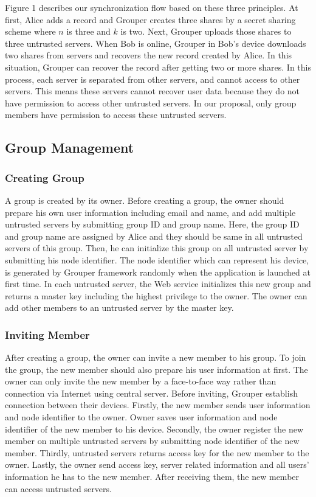 \documentclass[twocolumn,10pt]{article}
\begin{document}
Figure 1 describes our synchronization flow based on these three principles. At first, Alice adds a record and Grouper creates three shares by a secret sharing scheme where $n$ is three and $k$ is two. Next, Grouper uploads those shares to three untrusted servers. When Bob is online, Grouper in Bob's device downloads two shares from servers and recovers the new record created by Alice. In this situation, Grouper can recover the record after getting two or more shares. In this process, each server is separated from other servers, and cannot access to other servers. This means these servers cannot recover user data because they do not have permission to access other untrusted servers. In our proposal, only group members have permission to access these untrusted servers.

\subsection{Group Management}

\subsubsection{Creating Group}

A group is created by its owner. Before creating a group, the owner should prepare his own user information including email and name, and add multiple untrusted servers by submitting group ID and group name. Here, the group ID and group name are assigned by Alice and they should be same in all untrusted servers of this group. Then, he can initialize this group on all untrusted server by submitting his node identifier. The node identifier which can represent his device, is generated by Grouper framework randomly when the application is launched at first time. In each untrusted server, the Web service initializes this new group and returns a master key including the highest privilege to the owner. The owner can add other members to an untrusted server by the master key.

\subsubsection{Inviting Member}

After creating a group, the owner can invite a new member to his group. To join the group, the new member should also prepare his user information at first. The owner can only invite the new member by a face-to-face way rather than connection via Internet using central server. Before inviting, Grouper establish connection between their devices. Firstly, the new member sends user information and node identifier to the owner. Owner saves user information and node identifier of the new member to his device. Secondly, the owner register the new member on multiple untrusted servers by submitting node identifier of the new member. Thirdly, untrusted servers returns access key for the new member to the owner. Lastly, the owner send access key, server related information and all users' information he has to the new member. After receiving them, the new member can access untrusted servers.
\end{document}
